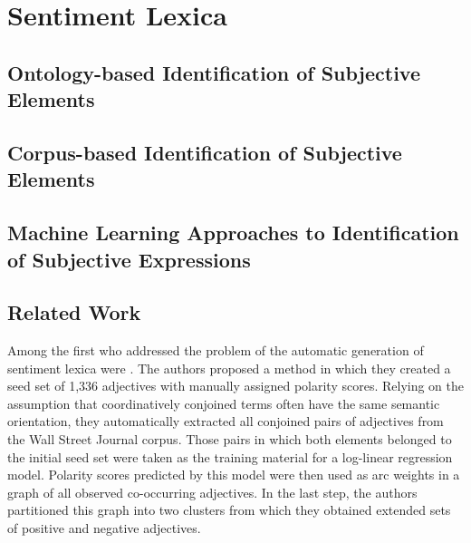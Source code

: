 

\section{Sentiment Lexica}
\subsection{Ontology-based Identification of Subjective Elements}
\subsection{Corpus-based Identification of Subjective Elements}
\subsection{Machine Learning Approaches to Identification of Subjective Expressions}

\subsection{Related Work}

Among the first who addressed the problem of the automatic generation
of sentiment lexica were \citet{Hatzivassi:97}.  The authors proposed
a method in which they created a seed set of 1,336 adjectives with
manually assigned polarity scores.  Relying on the assumption that
coordinatively conjoined terms often have the same semantic
orientation, they automatically extracted all conjoined pairs of
adjectives from the Wall Street Journal corpus.  Those pairs in which
both elements belonged to the initial seed set were taken as the
training material for a log-linear regression model.  Polarity scores
predicted by this model were then used as arc weights in a graph of
all observed co-occurring adjectives.  In the last step, the authors
partitioned this graph into two clusters from which they obtained
extended sets of positive and negative adjectives.

